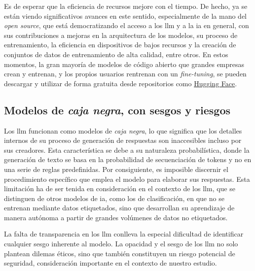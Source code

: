 Es de esperar que la eficiencia de recursos mejore con el tiempo. De hecho, ya se están viendo significativos avances en este sentido, especialmente de la mano del \emph{open source}, que está democratizando el acceso a los \gls{llm} y a la \gls{ia} en general, con sus contribuciones a mejoras en la arquitectura de los modelos, su proceso de entrenamiento, la eficiencia en dispositivos de bajos recursos y la creación de conjuntos de datos de entrenamiento de alta calidad, entre otros. En estos momentos, la gran mayoría de modelos de código abierto que grandes empresas crean y entrenan, y los propios usuarios rentrenan con un \emph{fine-tuning}, se pueden descargar y utilizar de forma gratuita desde repositorios como \href{https://huggingface.co/}{Hugging Face}.


\subsection{Modelos de \emph{caja negra}, con sesgos y riesgos}

Los \gls{llm} funcionan como modelos de \emph{caja negra}, lo que significa que los detalles internos de su proceso de generación de respuestas son inaccesibles incluso por sus creadores. Esta característica se debe a su naturaleza probabilística, donde la generación de texto se basa en la probabilidad de secuenciación de tokens y no en una serie de reglas predefinidas. Por consiguiente, es imposible discernir el procedimiento específico que emplea el modelo para elaborar sus respuestas. Esta limitación ha de ser tenida en consideración en el contexto de los \gls{llm}, que se distinguen de otros modelos de \gls{ia}, como los de clasificación, en que no se entrenan mediante datos etiquetados, sino que desarrollan su aprendizaje de manera autónoma a partir de grandes volúmenes de datos no etiquetados.

La falta de transparencia en los \gls{llm} conlleva la especial dificultad de identificar cualquier sesgo inherente al modelo. La opacidad y el sesgo de los \gls{llm} no solo plantean dilemas éticos, sino que también constituyen un riesgo potencial de seguridad, consideración importante en el contexto de nuestro estudio.